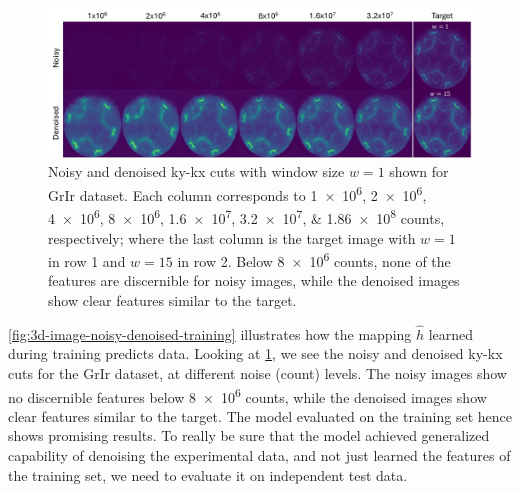 \begin{figure}
    \centering
    \includegraphics[width=1\linewidth]{images/images_noisy_denoised_with_target.pdf}
    \caption{Noisy and denoised \gls{ky}-\gls{kx} cuts with window size $w=1$ shown for \gls{GrIr} dataset. Each column corresponds to \numlist{1e6;2e6;4e6;8e6;1.6e7;3.2e7;1.86e8} counts, respectively; where the last column is the target image with $w=1$ in row 1 and $w=15$ in row 2. Below \num{8e6} counts, none of the features are discernible for noisy images, while the denoised images show clear features similar to the target.}
    \label{fig:images-noisy-denoised-training}
\end{figure}

\cref{fig:3d-image-noisy-denoised-training} illustrates how the mapping $\hat{h}$ learned during training predicts data. Looking at \cref{fig:images-noisy-denoised-training}, we see the noisy and denoised \gls{ky}-\gls{kx} cuts for the \gls{GrIr} dataset, at different noise (count) levels. The noisy images show no discernible features below \num{8e6} counts, while the denoised images show clear features similar to the target. The model evaluated on the training set hence shows promising results. To really be sure that the model achieved generalized capability of denoising the experimental data, and not just learned the features of the training set, we need to evaluate it on independent test data.



